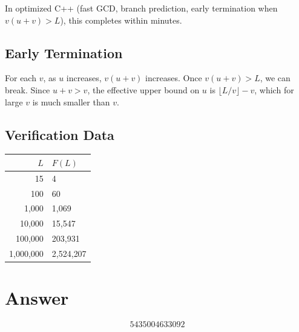 \documentclass[11pt]{article}
\begin{document}
In optimized C++ (fast GCD, branch prediction, early termination when
$v(u+v) > L$), this completes within minutes.

\subsection{Early Termination}

For each $v$, as $u$ increases, $v(u+v)$ increases. Once $v(u+v) > L$, we can
break. Since $u + v > v$, the effective upper bound on $u$ is
$\lfloor L/v \rfloor - v$, which for large $v$ is much smaller than $v$.

\subsection{Verification Data}

\begin{center}
\begin{tabular}{rl}
\toprule
$L$ & $F(L)$ \\
\midrule
15 & 4 \\
100 & 60 \\
1{,}000 & 1{,}069 \\
10{,}000 & 15{,}547 \\
100{,}000 & 203{,}931 \\
1{,}000{,}000 & 2{,}524{,}207 \\
\bottomrule
\end{tabular}
\end{center}

\section{Answer}

\[
\boxed{5435004633092}
\]
\end{document}
